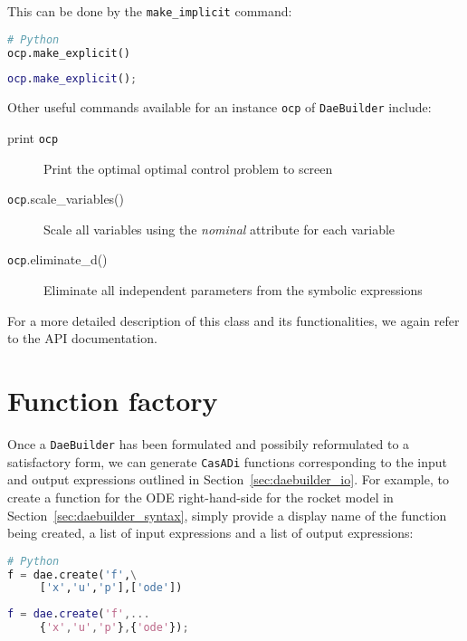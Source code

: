 \documentclass[a4paper,12pt]{book}
\newcommand{\CasADi}{\texttt{CasADi}\xspace}
\newcommand{\python}[1]{\lstinline[language=Python]{#1}}
\begin{document}
This can be done by the \python{make_implicit} command:

\begin{minipage}[t]{0.5\textwidth}
\begin{lstlisting}[language=Python]
# Python
ocp.make_explicit()
\end{lstlisting}
\end{minipage}
\begin{minipage}[t]{0.5\textwidth}
\begin{lstlisting}[language=Matlab]
% MATLAB
ocp.make_explicit();
\end{lstlisting}
\end{minipage}


Other useful commands available for an instance \texttt{ocp} of \texttt{DaeBuilder} include:
\begin{description}
\item[print \texttt{ocp}] Print the optimal optimal control problem to screen
\item[\texttt{ocp}.scale\_variables()] Scale all variables using the \emph{nominal} attribute for each variable
\item[\texttt{ocp}.eliminate\_d()] Eliminate all independent parameters from the symbolic expressions
\end{description}

For a more detailed description of this class and its functionalities, we again
refer to the API documentation.

\section{Function factory}
Once a \texttt{DaeBuilder} has been formulated and possibily reformulated to
a satisfactory form, we can generate \CasADi functions corresponding to the
input and output expressions outlined in Section~\ref{sec:daebuilder_io}.
For example, to create a function for the ODE right-hand-side for the rocket
model in Section~\ref{sec:daebuilder_syntax}, simply provide a display
name of the function being created, a list of input expressions
and a list of output expressions:

\begin{minipage}[t]{0.5\textwidth}
\begin{lstlisting}[language=Python]
# Python
f = dae.create('f',\
     ['x','u','p'],['ode'])
\end{lstlisting}
\end{minipage}
\begin{minipage}[t]{0.5\textwidth}
\begin{lstlisting}[language=Matlab]
% MATLAB
f = dae.create('f',...
     {'x','u','p'},{'ode'});
\end{lstlisting}
\end{minipage}
\end{document}
